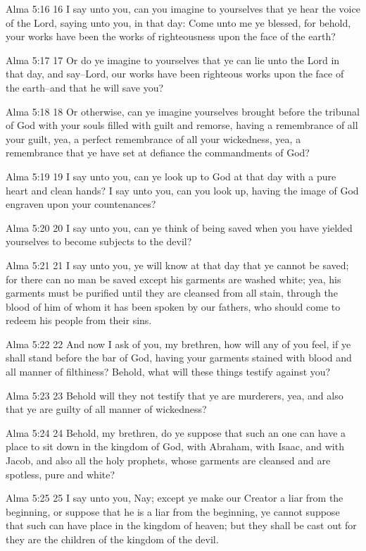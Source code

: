 Alma 5:16
 16 I say unto you, can you imagine to yourselves that ye hear
the voice of the Lord, saying unto you, in that day: Come unto me
ye blessed, for behold, your works have been the works of
righteousness upon the face of the earth?

Alma 5:17
 17 Or do ye imagine to yourselves that ye can lie unto the Lord
in that day, and say--Lord, our works have been righteous works
upon the face of the earth--and that he will save you?

Alma 5:18
 18 Or otherwise, can ye imagine yourselves brought before the
tribunal of God with your souls filled with guilt and remorse,
having a remembrance of all your guilt, yea, a perfect
remembrance of all your wickedness, yea, a remembrance that ye
have set at defiance the commandments of God?

Alma 5:19
 19 I say unto you, can ye look up to God at that day with a pure
heart and clean hands? I say unto you, can you look up, having
the image of God engraven upon your countenances?

Alma 5:20
 20 I say unto you, can ye think of being saved when you have
yielded yourselves to become subjects to the devil?

Alma 5:21
 21 I say unto you, ye will know at that day that ye cannot be
saved; for there can no man be saved except his garments are
washed white; yea, his garments must be purified until they are
cleansed from all stain, through the blood of him of whom it has
been spoken by our fathers, who should come to redeem his people
from their sins.

Alma 5:22
 22 And now I ask of you, my brethren, how will any of you feel,
if ye shall stand before the bar of God, having your garments
stained with blood and all manner of filthiness? Behold, what
will these things testify against you?

Alma 5:23
 23 Behold will they not testify that ye are murderers, yea, and
also that ye are guilty of all manner of wickedness?

Alma 5:24
 24 Behold, my brethren, do ye suppose that such an one can have
a place to sit down in the kingdom of God, with Abraham, with
Isaac, and with Jacob, and also all the holy prophets, whose
garments are cleansed and are spotless, pure and white?

Alma 5:25
 25 I say unto you, Nay; except ye make our Creator a liar from
the beginning, or suppose that he is a liar from the beginning,
ye cannot suppose that such can have place in the kingdom of
heaven; but they shall be cast out for they are the children of
the kingdom of the devil.

